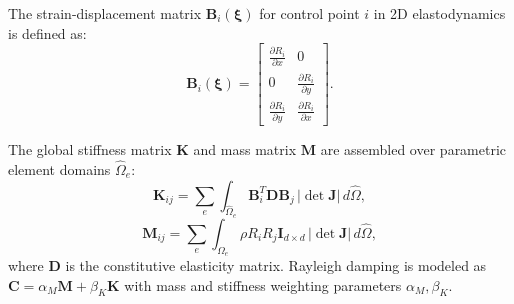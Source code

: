 The strain-displacement matrix $\bm{B}_i(\bm{\xi})$ for control point $i$ in 2D elastodynamics is defined as:
\begin{equation}
    \bm{B}_i(\bm{\xi}) = \begin{bmatrix}
        \frac{\partial R_i}{\partial x} & 0 \\[4pt]
        0 & \frac{\partial R_i}{\partial y} \\[4pt]
        \frac{\partial R_i}{\partial y} & \frac{\partial R_i}{\partial x}
    \end{bmatrix}.
\end{equation}

The global stiffness matrix $\bm{K}$ and mass matrix $\bm{M}$ are assembled over parametric element domains $\hat{\Omega}_e$:
\begin{equation}
    \bm{K}_{ij} = \sum_{e} \int_{\hat{\Omega}_e} \bm{B}_i^T \bm{D} \bm{B}_j \, |\det \bm{J}| \, d\hat{\Omega},
\end{equation}
\begin{equation}
    \bm{M}_{ij} = \sum_{e} \int_{\hat{\Omega}_e} \rho R_i R_j \bm{I}_{d \times d} \, |\det \bm{J}| \, d\hat{\Omega},
\end{equation}
where $\bm{D}$ is the constitutive elasticity matrix. Rayleigh damping is modeled as $\bm{C} = \alpha_M \bm{M} + \beta_K \bm{K}$ with mass and stiffness weighting parameters $\alpha_M, \beta_K$.
